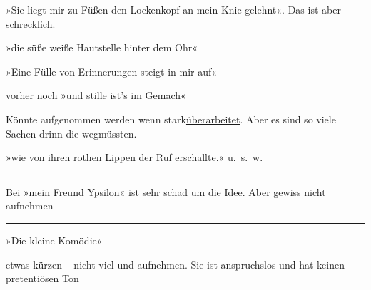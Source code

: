 \pstart
           »Sie liegt mir zu Füßen den
                  Lockenkopf an mein Knie gelehnt«. Das ist aber schrecklich.\pend
           
\pstart
           »die süße weiße Hautstelle hinter
                  dem Ohr«\pend
           
\pstart
           »Eine Fülle von Erinnerungen steigt
                  in mir auf«\pend
           
\pstart
           vorher noch »und stille ist’s im
                  Gemach«\pend
           
\pstart
           {\pb}\pend
           
\pstart
           {\pb}Könnte aufgenommen werden wenn
                  \introOben{}stark\introOben{}{ }\uline{überarbeitet}. Aber es sind so viele Sachen drinn die
               wegmüssten.\pend
           
\pstart
           »wie von ihren rothen Lippen der
                  Ruf erschallte.« u. s. w.\pend
           \noindent\rule{\textwidth}{0.5pt}
\pstart
           Bei »mein \uline{Freund
                     Ypsilon}« ist sehr schad um die Idee. \uline{Aber gewiss} nicht
               aufnehmen\pend
           \noindent\rule{\textwidth}{0.5pt}
\pstart
           »Die kleine Komödie«\pend
           
\pstart
           etwas kürzen – nicht viel und aufnehmen. Sie ist anspruchslos und hat keinen
               pretentiösen Ton\pend
           \endnumbering{}  
      